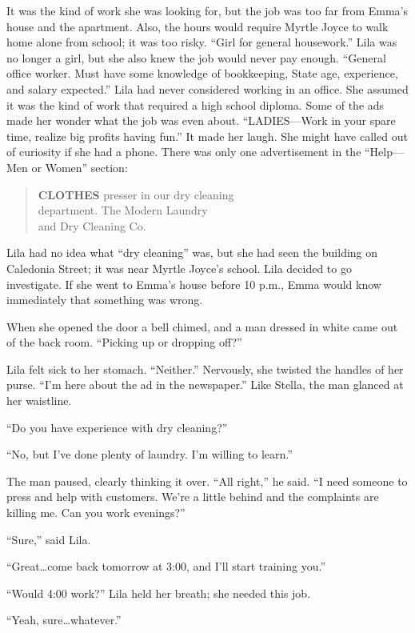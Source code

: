 \documentclass[
  american,
  letterpaper,
]{book}
\begin{document}
It was the kind of work she was looking for, but the job was too far
from Emma's house and the apartment. Also, the hours would require
Myrtle Joyce to walk home alone from school; it was too risky. ``Girl
for general housework.'' Lila was no longer a girl, but she also knew
the job would never pay enough. ``General office worker. Must have some
knowledge of bookkeeping, State age, experience, and salary expected.''
Lila had never considered working in an office. She assumed it was the
kind of work that required a high school diploma. Some of the ads made
her wonder what the job was even about. ``LADIES---Work in your spare
time, realize big profits having fun.'' It made her laugh. She might
have called out of curiosity if she had a phone. There was only one
advertisement in the ``Help---Men or Women'' section:

\begin{quote}
\textbf{CLOTHES} presser in our dry cleaning\\
department. The Modern Laundry\\
and Dry Cleaning Co.~
\end{quote}

Lila had no idea what ``dry cleaning'' was, but she had seen the
building on Caledonia Street; it was near Myrtle Joyce's school. Lila
decided to go investigate. If she went to Emma's house before 10 p.m.,
Emma would know immediately that something was wrong.

When she opened the door a bell chimed, and a man dressed in white came
out of the back room. ``Picking up or dropping off?''

Lila felt sick to her stomach. ``Neither.'' Nervously, she twisted the
handles of her purse. ``I'm here about the ad in the newspaper.'' Like
Stella, the man glanced at her waistline.

``Do you have experience with dry cleaning?''

``No, but I've done plenty of laundry. I'm willing to learn.''

The man paused, clearly thinking it over. ``All right,'' he said. ``I
need someone to press and help with customers. We're a little behind and
the complaints are killing me. Can you work evenings?''

``Sure,'' said Lila.

``Great\ldots come back tomorrow at 3:00, and I'll start training you.''

``Would 4:00 work?'' Lila held her breath; she needed this job.

``Yeah, sure\ldots whatever.''
\end{document}
